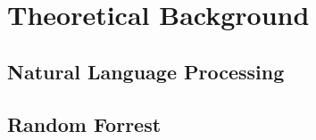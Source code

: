 \chapter{Theoretical Background}

\label{chap:ch2}
\section{Natural Language Processing}
\section{Random Forrest}
\par
